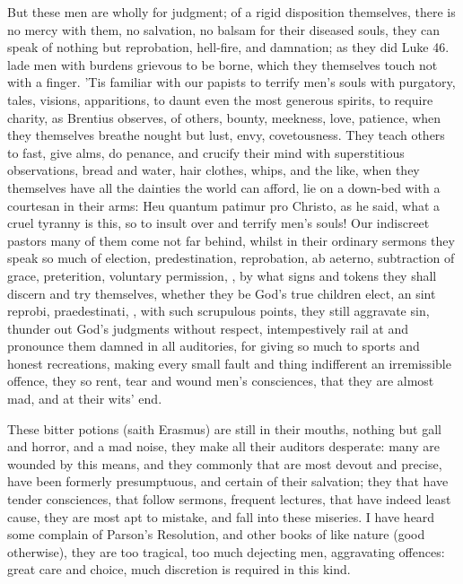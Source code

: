 {But these men are wholly for judgment; of a rigid disposition
themselves, there is no mercy with them, no salvation, no balsam for
their diseased souls, they can speak of nothing but reprobation,
hell-fire, and damnation; as they did Luke  46. lade men with
burdens grievous to be borne, which they themselves touch not with a
finger. 'Tis familiar with our papists to terrify men's souls with
purgatory, tales, visions, apparitions, to daunt even the most generous
spirits, to require charity, as Brentius observes, of others,
bounty, meekness, love, patience, when they themselves breathe nought
but lust, envy, covetousness. They teach others to fast, give alms, do
penance, and crucify their mind with superstitious observations, bread
and water, hair clothes, whips, and the like, when they themselves have
all the dainties the world can afford, lie on a down-bed with a
courtesan in their arms: Heu quantum patimur pro Christo, as he
said, what a cruel tyranny is this, so to insult over and terrify men's
souls! Our indiscreet pastors many of them come not far behind, whilst
in their ordinary sermons they speak so much of election,
predestination, reprobation, ab aeterno, subtraction of grace,
preterition, voluntary permission, \etc{}, by what signs and tokens they
shall discern and try themselves, whether they be God's true children
elect, an sint reprobi, praedestinati, \etc{}, with such scrupulous
points, they still aggravate sin, thunder out God's judgments without
respect, intempestively rail at and pronounce them damned in all
auditories, for giving so much to sports and honest recreations, making
every small fault and thing indifferent an irremissible offence, they
so rent, tear and wound men's consciences, that they are almost mad,
and at their wits' end.

These bitter potions (saith Erasmus) are still in their mouths,
nothing but gall and horror, and a mad noise, they make all their
auditors desperate: many are wounded by this means, and they commonly
that are most devout and precise, have been formerly presumptuous, and
certain of their salvation; they that have tender consciences, that
follow sermons, frequent lectures, that have indeed least cause, they
are most apt to mistake, and fall into these miseries. I have heard
some complain of Parson's Resolution, and other books of like nature
(good otherwise), they are too tragical, too much dejecting men,
aggravating offences: great care and choice, much discretion is
required in this kind.

}
